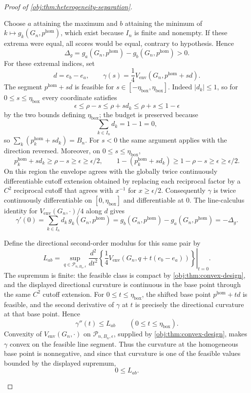 \begin{proof}[Proof of \cref{obj:thm:heterogeneity-separation}]
\begin{enumerate}
Choose \(a\) attaining the maximum and \(b\) attaining the minimum of
\(k\mapsto g_k(G_n,p^{\mathrm{hom}})\), which exist because \(I_n\) is finite and nonempty.  If these extrema were equal, all scores would be equal, contrary to hypothesis.  Hence
\[
\Delta_g
=g_a(G_n,p^{\mathrm{hom}})-g_b(G_n,p^{\mathrm{hom}})
>0.
\]
For these extremal indices, set
\[
d=e_b-e_a,
\qquad
\gamma(s)=\frac14V_{\mathrm{env}}(G_n,p^{\mathrm{hom}}+sd).
\]
The segment \(p^{\mathrm{hom}}+sd\) is feasible for \(s\in[-\eta_{\mathrm{box}},\eta_{\mathrm{box}}]\).  Indeed \(|d_k|\le1\), so for \(0\le s\le\eta_{\mathrm{box}}\) every coordinate satisfies
\[
\epsilon\le\rho-s\le\rho+sd_k\le\rho+s\le1-\epsilon
\]
by the two bounds defining \(\eta_{\mathrm{box}}\); the budget is preserved because
\[
\sum_{k\in I_n}d_k=1-1=0,
\]
so \(\sum_k(p^{\mathrm{hom}}_k+sd_k)=B_n\).  For \(s<0\) the same argument applies with the direction reversed.  Moreover, on \(0\le s\le\eta_{\mathrm{box}}\),
\[
p^{\mathrm{hom}}_k+sd_k\ge\rho-s\ge\epsilon\ge\epsilon/2,
\qquad
1-(p^{\mathrm{hom}}_k+sd_k)\ge1-\rho-s\ge\epsilon\ge\epsilon/2.
\]
On this region the envelope agrees with the globally twice continuously differentiable cutoff extension obtained by replacing each reciprocal factor by a \(C^2\) reciprocal cutoff that agrees with \(x^{-1}\) for \(x\ge\epsilon/2\).  Consequently \(\gamma\) is twice continuously differentiable on \([0,\eta_{\mathrm{box}}]\) and differentiable at \(0\).  The line-calculus identity for \(V_{\mathrm{env}}(G_n,\cdot)/4\) along \(d\) gives
\[
\gamma'(0)=\sum_{k\in I_n}d_k\,g_k(G_n,p^{\mathrm{hom}})
=g_b(G_n,p^{\mathrm{hom}})-g_a(G_n,p^{\mathrm{hom}})
=-\Delta_g.
\]

Define the directional second-order modulus for this same pair by
\[
L_{ab}
=
\sup_{q\in\mathcal P_{n,B_n,\epsilon}}
\left.
\frac{d^2}{dt^2}
\left\{\frac14V_{\mathrm{env}}(G_n,q+t(e_b-e_a))\right\}
\right|_{t=0}.
\]
The supremum is finite: the feasible class is compact by \cref{obj:thm:convex-design}, and the displayed directional curvature is continuous in the base point through the same \(C^2\) cutoff extension.  For \(0\le t\le\eta_{\mathrm{box}}\), the shifted base point \(p^{\mathrm{hom}}+td\) is feasible, and the second derivative of \(\gamma\) at \(t\) is precisely the directional curvature at that base point.  Hence
\[
\gamma''(t)\le L_{ab}
\qquad(0\le t\le\eta_{\mathrm{box}}).
\]
Convexity of \(V_{\mathrm{env}}(G_n,\cdot)\) on \(\mathcal P_{n,B_n,\epsilon}\), supplied by \cref{obj:thm:convex-design}, makes \(\gamma\) convex on the feasible line segment.  Thus the curvature at the homogeneous base point is nonnegative, and since that curvature is one of the feasible values bounded by the displayed supremum,
\[
0\le L_{ab}.
\]


\end{enumerate}
\end{proof}
